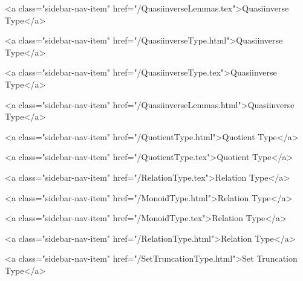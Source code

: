       
        
          <a class="sidebar-nav-item" href="/QuasiinverseLemmas.tex">Quasiinverse Type</a>
        
      
    
      
        
          <a class="sidebar-nav-item" href="/QuasiinverseType.html">Quasiinverse Type</a>
        
      
    
      
        
          <a class="sidebar-nav-item" href="/QuasiinverseType.tex">Quasiinverse Type</a>
        
      
    
      
        
          <a class="sidebar-nav-item" href="/QuasiinverseLemmas.html">Quasiinverse Type</a>
        
      
    
      
        
          <a class="sidebar-nav-item" href="/QuotientType.html">Quotient Type</a>
        
      
    
      
        
          <a class="sidebar-nav-item" href="/QuotientType.tex">Quotient Type</a>
        
      
    
      
        
          <a class="sidebar-nav-item" href="/RelationType.tex">Relation Type</a>
        
      
    
      
        
          <a class="sidebar-nav-item" href="/MonoidType.html">Relation Type</a>
        
      
    
      
        
          <a class="sidebar-nav-item" href="/MonoidType.tex">Relation Type</a>
        
      
    
      
        
          <a class="sidebar-nav-item" href="/RelationType.html">Relation Type</a>
        
      
    
      
        
          <a class="sidebar-nav-item" href="/SetTruncationType.html">Set Truncation Type</a>
        

